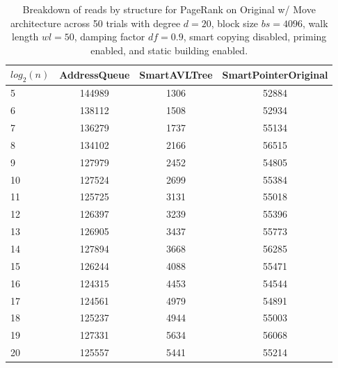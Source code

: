 \begin{table}[]
\centering
\begin{tabular}{|l|c|c|c|}
$log_2(n)$ & AddressQueue & SmartAVLTree & SmartPointerOriginal \\ \hline
5 & 144989 & 1306 & 52884 \\ \hline
6 & 138112 & 1508 & 52934 \\ \hline
7 & 136279 & 1737 & 55134 \\ \hline
8 & 134102 & 2166 & 56515 \\ \hline
9 & 127979 & 2452 & 54805 \\ \hline
10 & 127524 & 2699 & 55384 \\ \hline
11 & 125725 & 3131 & 55018 \\ \hline
12 & 126397 & 3239 & 55396 \\ \hline
13 & 126905 & 3437 & 55773 \\ \hline
14 & 127894 & 3668 & 56285 \\ \hline
15 & 126244 & 4088 & 55471 \\ \hline
16 & 124315 & 4453 & 54544 \\ \hline
17 & 124561 & 4979 & 54891 \\ \hline
18 & 125237 & 4944 & 55003 \\ \hline
19 & 127331 & 5634 & 56068 \\ \hline
20 & 125557 & 5441 & 55214 \\ \hline
\end{tabular}
\caption{Breakdown of reads by structure for PageRank on Original w/ Move architecture across 50 trials with degree $d=20$, block size $bs=4096$, walk length $wl=50$, damping factor $df=0.9$, smart copying disabled, priming enabled, and static building enabled.}
    \label{tab:reads_by_structure_pr_d20_bs4096_trials50_copiesfalse_primetrue_staticinsertiontrue_wl50_df0.9_ptoriginal_movetrue}
\end{table}

